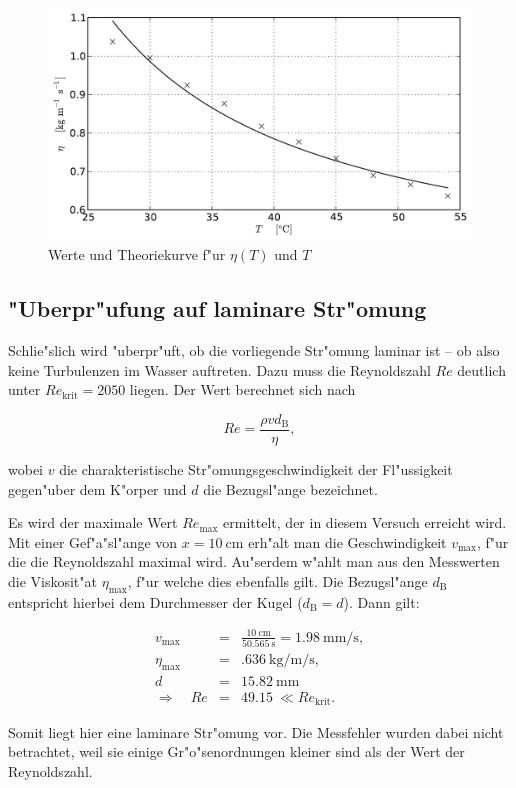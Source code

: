 		\begin{figure}[h!]
			\centering
			\includegraphics[width = 15cm]{img/plot2.pdf}
			\caption{Werte und Theoriekurve f"ur $\eta(T)$ und $T$}
			\label{fig:graph}
		\end{figure}

	\clearpage

	\subsection{"Uberpr"ufung auf laminare Str"omung}
		\label{sub:laminar}

		Schlie"slich wird "uberpr"uft, ob die vorliegende Str"omung laminar ist -- ob also keine Turbulenzen im Wasser auftreten.
		Dazu muss die Reynoldszahl $Re$ deutlich unter $Re_\mathrm{krit} = 2050$ liegen.
		Der Wert berechnet sich nach

		\begin{equation*}
			Re = \frac{\rho v d_\mathrm{B}}{\eta} ,
		\end{equation*}

		wobei $v$ die charakteristische Str"omungsgeschwindigkeit der Fl"ussigkeit gegen"uber dem K"orper und $d$ die Bezugsl"ange bezeichnet.

		Es wird der maximale Wert $Re_\mathrm{max}$ ermittelt, der in diesem Versuch erreicht wird.
		Mit einer Gef"a"sl"ange von $x = \SI{10}{\centi \meter}$ erh"alt man die Geschwindigkeit $v_\mathrm{max}$, f"ur die die Reynoldszahl maximal wird.
		Au"serdem w"ahlt man aus den Messwerten die Viskosit"at $\eta_\mathrm{max}$, f"ur welche dies ebenfalls gilt.
		Die Bezugsl"ange $d_\mathrm{B}$ entspricht hierbei dem Durchmesser der Kugel ($d_\mathrm{B} = d$).
		Dann gilt:

		\begin{eqnarray*}
			v_\mathrm{max} & = & \frac{\SI{10}{\centi \meter}}{\SI{50.565}{\second}} = \SI{1.98}{\milli \meter \per \second} , \\
			\eta_\mathrm{max} & = & \SI{.636}{\kilo \gram \per \meter \per \second} , \\
			d & = & \SI{15.82}{\milli \meter} \\
			\Rightarrow \quad Re & = & \SI{49.15}{} \ll Re_\mathrm{krit} .
		\end{eqnarray*}

		Somit liegt hier eine laminare Str"omung vor.
		Die Messfehler wurden dabei nicht betrachtet, weil sie einige Gr"o"senordnungen kleiner sind als der Wert der Reynoldszahl.